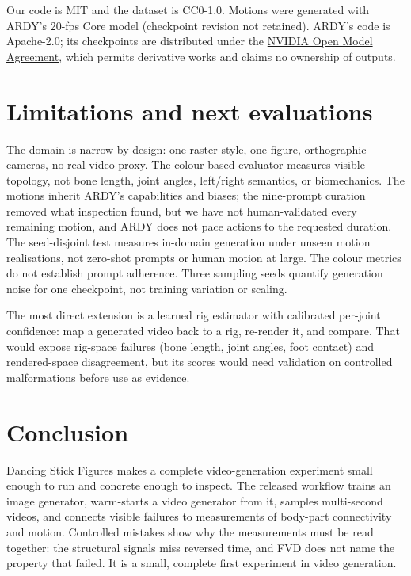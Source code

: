\documentclass[10pt,twocolumn]{article}
\begin{document}
Our code is MIT and the dataset is CC0-1.0. Motions were generated with ARDY's 20-fps Core model (checkpoint
revision not retained). ARDY's code is Apache-2.0; its checkpoints are distributed under the
\href{https://www.nvidia.com/en-us/agreements/enterprise-software/nvidia-open-model-agreement/}{NVIDIA Open
Model Agreement}, which permits derivative works and claims no ownership of outputs.

\section{Limitations and next evaluations}\label{sec:future}
The domain is narrow by design: one raster style, one figure, orthographic cameras, no real-video proxy. The
colour-based evaluator measures visible topology, not bone length, joint angles, left/right semantics, or
biomechanics. The motions inherit ARDY's capabilities and biases; the nine-prompt curation removed what
inspection found, but we have not human-validated every remaining motion, and ARDY does not pace actions to the
requested duration. The seed-disjoint test measures in-domain generation under unseen motion realisations, not
zero-shot prompts or human motion at large. The colour metrics do not establish prompt adherence. Three
sampling seeds quantify generation noise for one checkpoint, not training variation or scaling.

The most direct extension is a learned rig estimator with calibrated per-joint confidence: map a generated
video back to a rig, re-render it, and compare. That would expose rig-space failures (bone length, joint
angles, foot contact) and rendered-space disagreement, but its scores would need validation on controlled
malformations before use as evidence.

\section{Conclusion}
Dancing Stick Figures makes a complete video-generation experiment small enough to run and concrete enough to
inspect. The released workflow trains an image generator, warm-starts a video generator from it, samples
multi-second videos, and connects visible failures to measurements of body-part connectivity and motion.
Controlled mistakes show why the measurements must be read together: the structural signals miss reversed time,
and FVD does not name the property that failed. It is a small, complete first experiment in video generation.
\end{document}
